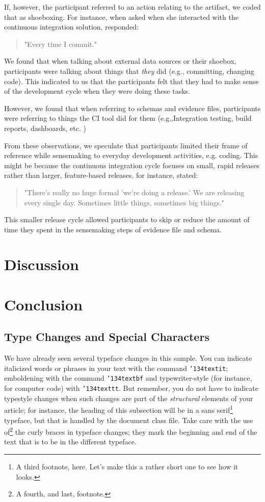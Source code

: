 \documentclass{sig-alternate-05-2015}
\begin{document}
If, however, the participant referred to an action relating to the artifact, we coded that as shoeboxing. For instance, when asked when she interacted with the continuous integration solution, \srutitwo responded: 

\begin{quote}
"Every time I commit."	
\end{quote}


We found that when talking about external data sources  or their shoebox, participants were talking about things that \textit{they} did (e.g., committing, changing code). This indicated to us that the participants felt that they had to make sense of the development cycle when they were doing these tasks. 

However, we found that when referring to schemas and evidence files, participants were referring to things the CI tool did for them (e.g.,Integration testing, build reports, dashboards, etc.
) 

From these observations, we speculate that participants limited their frame of reference while sensemaking to everyday development activities, e.g. coding. This might be because the continuous integration cycle focuses on small, rapid releases rather than larger, feature-based releases. for instance, \cpg stated:

\begin{quote}
"There's really no huge formal 'we're doing a release.' We are releasing every single day. Sometimes little things, sometimes big things."	
\end{quote}


This smaller release cycle allowed participants to skip or reduce the amount of time they spent in the sensemaking steps of evidence file and schema. 

\section{Discussion}
\section{Conclusion}

\subsection{Type Changes and {\subsecit Special} Characters}
We have already seen several typeface changes in this sample.  You
can indicate italicized words or phrases in your text with
the command \texttt{{\char'134}textit}; emboldening with the
command \texttt{{\char'134}textbf}
and typewriter-style (for instance, for computer code) with
\texttt{{\char'134}texttt}.  But remember, you do not
have to indicate typestyle changes when such changes are
part of the \textit{structural} elements of your
article; for instance, the heading of this subsection will
be in a sans serif\footnote{A third footnote, here.
Let's make this a rather short one to
see how it looks.} typeface, but that is handled by the
document class file. Take care with the use
of\footnote{A fourth, and last, footnote.}
the curly braces in typeface changes; they mark
the beginning and end of
the text that is to be in the different typeface.
\end{document}
